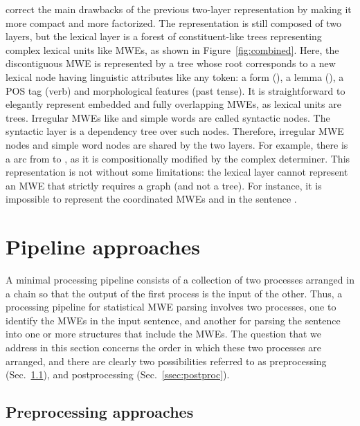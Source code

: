 \documentclass[output=paper]{LSP/langsci}
\begin{document}
\citet{constantnivre16} correct the main drawbacks of the previous two-layer representation by making it more compact and more factorized. The representation is still composed of two layers, but the lexical layer is a forest of constituent-like trees representing complex lexical units like MWEs, as shown in Figure~\ref{fig:combined}.
Here, the discontiguous MWE  is represented by a tree whose root corresponds to a new lexical node having linguistic attributes like any token: a form (), a lemma (), a POS tag (verb) and morphological features (past tense).
It is straightforward to elegantly represent embedded and fully overlapping MWEs, as lexical units are trees.
Irregular MWEs like  and simple words are called syntactic nodes. The syntactic layer is a dependency tree over such nodes. Therefore, irregular MWE nodes and simple word nodes are shared by the two layers. For example, there is a  arc from  to , as it is compositionally modified by the complex determiner.  This representation is not without some limitations: the lexical layer cannot represent an MWE that strictly requires a graph (and not a tree). For instance, it is impossible to represent the coordinated MWEs  and  in the sentence . 






%
\section{Pipeline approaches}
\label{sec:pipeline}

A minimal processing pipeline consists of a collection of two processes arranged in a chain so that the output of the first process is the input of the other. Thus, a processing pipeline for statistical MWE parsing involves two processes, one to identify the MWEs in the input sentence, and another for parsing the sentence into one or more structures that include the MWEs. The question that we address in this section concerns the order in which these two processes are arranged, and there are clearly two possibilities referred to as preprocessing (Sec.~\ref{ssec:preproc}), and postprocessing (Sec.~\ref{ssec:postproc}).

\subsection{Preprocessing approaches}
\label{ssec:preproc}
\end{document}
